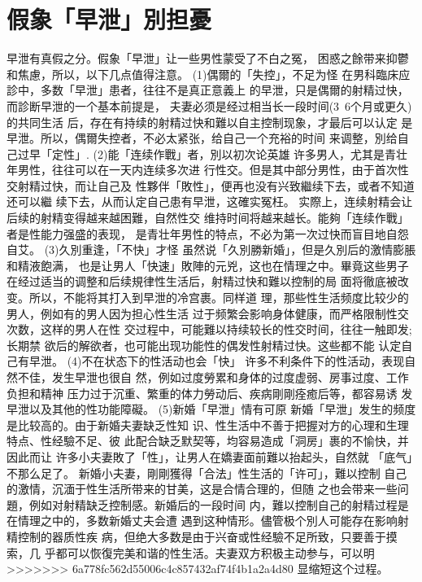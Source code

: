 \documentclass[12pt,UTF8]{ctexbook}
\begin{document}
\section{假象「早泄」別担憂}

早泄有真假之分。假象「早泄」让一些男性蒙受了不白之冤，
困惑之餘带来抑鬱和焦慮，所以，以下几点值得注意。
(1)偶爾的「失控」，不足为怪
在男科臨床应診中，多数「早泄」患者，往往不是真正意義上
的早泄，只是偶爾的射精过快，而診断早泄的一个基本前提是，
夫妻必须是经过相当长一段时间(3~6个月或更久)的共同生活
后，存在有持续的射精过快和難以自主控制现象，才最后可以认定
是早泄。所以，偶爾失控者，不必太紧张，给自己一个充裕的时间
来调整，別给自己过早「定性」.
(2)能「连续作戰」者，別以初次论英雄
许多男人，尤其是青壮年男性，往往可以在一天内连续多次进
行性交。但是其中部分男性，由于首次性交射精过快，而让自己及
性夥伴「敗性」，便再也没有兴致繼续下去，或者不知道还可以繼
续下去，从而认定自己患有早泄，这確实冤枉。
实際上，连续射精会让后续的射精变得越来越困難，自然性交
维持时间将越来越长。能夠「连续作戰」者是性能力强盛的表现，
是青壮年男性的特点，不必为第一次过快而盲目地自怨自艾。
(3)久別重逢，「不快」才怪
虽然说「久別勝新婚」，但是久別后的激情膨脹和精液飽满，
也是让男人「快速」敗陣的元兇，这也在情理之中。畢竟这些男子
在经过适当的调整和后续規律性生活后，射精过快和難以控制的局
面将徹底被改变。所以，不能将其打入到早泄的冷宫裹。同样道
理，那些性生活频度比较少的男人，例如有的男人因为担心性生活
过于频繁会影响身体健康，而严格限制性交次数，这样的男人在性
交过程中，可能難以持续较长的性交时间，往往一触即发;长期禁
欲后的解欲者，也可能出现功能性的偶发性射精过快。这些都不能
认定自己有早泄。
(4)不在状态下的性活动也会「快」
许多不利条件下的性活动，表现自然不佳，发生早泄也很自
然，例如过度勞累和身体的过度虚弱、房事过度、工作负担和精神
压力过于沉重、繁重的体力勞动后、疾病剛剛痊癒后等，都容易诱
发早泄以及其他的性功能障礙。
(5)新婚「早泄」情有可原
新婚「早泄」发生的频度是比较高的。由于新婚夫妻缺乏性知
识、性生活中不善于把握对方的心理和生理特点、性经驗不足、彼
此配合缺乏默契等，均容易造成「洞房」裹的不愉快，并因此而让
许多小夫妻敗了「性」，让男人在嬌妻面前難以抬起头，自然就
「底气」不那么足了。
新婚小夫妻，剛剛獲得「合法」性生活的「许可」，難以控制
自己的激情，沉湎于性生活所带来的甘美，这是合情合理的，但随
之也会带来一些问題，例如对射精缺乏控制感。新婚后的一段时间
内，難以控制自己的射精过程是在情理之中的，多数新婚丈夫会遭
遇到这种情形。儘管极个別人可能存在影响射精控制的器质性疾
病，但绝大多数是由于兴奋或性经驗不足所致，只要善于摸索，几
乎都可以恢復完美和谐的性生活。夫妻双方积极主动参与，可以明
>>>>>>> 6a778fc562d55006c4c857432af74f4b1a2a4d80
显缩短这个过程。
\end{document}
